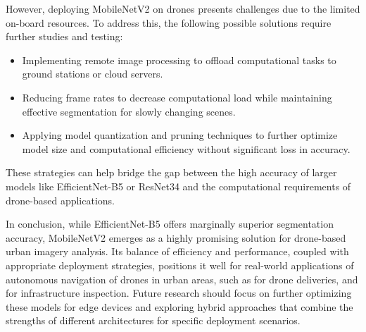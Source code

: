 \documentclass[a4paper]{article}
\begin{document}
However, deploying MobileNetV2 on drones presents challenges due to the limited on-board resources. To address this, the following possible solutions require further studies and testing:

\begin{itemize}
    \item Implementing remote image processing to offload computational tasks to ground stations or cloud servers.
    \item Reducing frame rates to decrease computational load while maintaining effective segmentation for slowly changing scenes.
    \item Applying model quantization and pruning techniques to further optimize model size and computational efficiency without significant loss in accuracy.
\end{itemize}

These strategies can help bridge the gap between the high accuracy of larger models like EfficientNet-B5 or ResNet34 and the computational requirements of drone-based applications.

In conclusion, while EfficientNet-B5 offers marginally superior segmentation accuracy, MobileNetV2 emerges as a highly promising solution for drone-based urban imagery analysis. Its balance of efficiency and performance, coupled with appropriate deployment strategies, positions it well for real-world applications of autonomous navigation of drones in urban areas, such as for drone deliveries, and for infrastructure inspection. Future research should focus on further optimizing these models for edge devices and exploring hybrid approaches that combine the strengths of different architectures for specific deployment scenarios.


\end{document}
